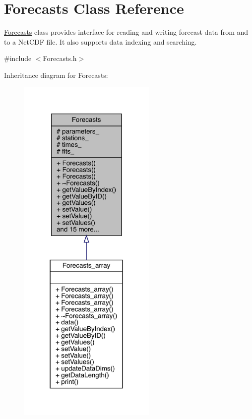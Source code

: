 \hypertarget{class_forecasts}{}\section{Forecasts Class Reference}
\label{class_forecasts}


\mbox{\hyperlink{class_forecasts}{Forecasts}} class provides interface for reading and writing forecast data from and to a Net\+C\+DF file. It also supports data indexing and searching.  




{\ttfamily \#include $<$Forecasts.\+h$>$}



Inheritance diagram for Forecasts\+:\nopagebreak
\begin{figure}[H]
\begin{center}
\leavevmode
\includegraphics[width=189pt]{class_forecasts__inherit__graph}
\end{center}
\end{figure}


